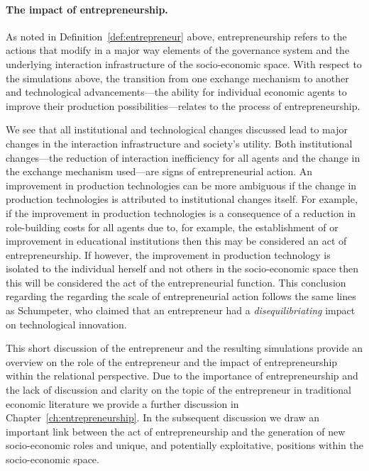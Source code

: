\paragraph{The impact of entrepreneurship.} %
\label{par:the_impact_of_entrepreneurship_}


As noted in Definition~\ref{def:entrepreneur} above, entrepreneurship refers to the actions that modify in a major way elements of the governance system and the underlying interaction infrastructure of the socio-economic space. With respect to the simulations above, the transition from one exchange mechanism to another and technological advancements---the ability for individual economic agents to improve their production possibilities---relates to the process of entrepreneurship. 

We see that all institutional and technological changes discussed lead to major changes in the interaction infrastructure and society's utility. Both institutional changes---the reduction of interaction inefficiency for all agents and the change in the exchange mechanism used---are signs of entrepreneurial action. An improvement in production technologies can be more ambiguous if the change in production technologies is attributed to institutional changes itself. For example, if the improvement in production technologies is a consequence of a reduction in role-building costs for all agents due to, for example, the establishment of or improvement in educational institutions then this may be considered an act of entrepreneurship. If however, the improvement in production technology is isolated to the individual herself and not others in the socio-economic space then this will be considered the act of the entrepreneurial function. This conclusion regarding the regarding the scale of entrepreneurial action follows the same lines as Schumpeter, who claimed that an entrepreneur had a \emph{disequilibriating} impact on technological innovation. 

This short discussion of the entrepreneur and the resulting simulations provide an overview on the role of the entrepreneur and the impact of entrepreneurship within the relational perspective. Due to the importance of entrepreneurship and the lack of discussion and clarity on the topic of the entrepreneur in traditional economic literature we provide a further discussion in Chapter~\ref{ch:entrepreneurship}. In the subsequent discussion we draw an important link between the act of entrepreneurship and the generation of new socio-economic roles and unique, and potentially exploitative, positions within the socio-economic space.
